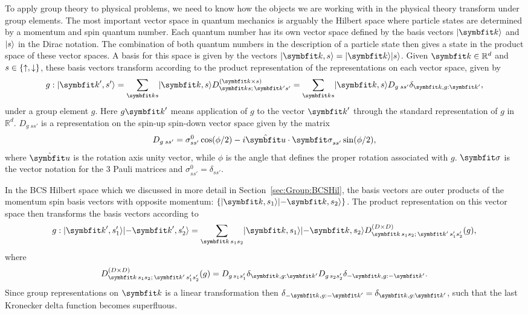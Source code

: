 To apply group theory to physical problems, we need to know how the objects we are working with in the physical theory transform under group elements.
The most important vector space in quantum mechanics is arguably the Hilbert space where particle states are determined by a momentum and spin
quantum number. Each quantum number has its own vector space defined by the basis vectors $\ket{\v{k}}$ and $\lvert s \rangle$ in the Dirac notation. The
combination of both quantum numbers in the description of a particle state then gives a state in the product space of these vector spaces.
A basis for this space is given by the vectors $\ket{\v{k},s} = \ket{\v{k}}\ket{s}$. Given $\v{k}\in\mathbb{R}^d$ and $s\in\{\uparrow,\downarrow\}$,
these basis vectors transform according to the product representation of the representations on each vector space, given by
\begin{equation}
    \label{eq:Group:App}
    g : \ket{\v{k}',s'} = \sum_{\v{k}s}\ket{\v{k},s}D^{(\v{k}\times s)}_{\v{k}s;\,\v{k}'s'} = \sum_{\v{k}s}\ket{\v{k},s}D_{g\;ss'}\delta_{\v{k},g:\v{k}'},
\end{equation}
under a group element $g$. Here $g\v{k}'$ means application of $g$ to the vector $\v{k}'$ through the standard representation of $g$ in $\mathbb{R}^d$.
$D_{g\;ss'}$ is a representation on the spin-up spin-down vector space given by the matrix
\begin{equation}
    \label{eq:Group:Prod:spinRepMatrix}
    D_{g\;ss'} = \sigma^0_{ss'}\cos(\phi/2) - i\hat{\v{u}}\cdot\v{\sigma}_{ss'}\sin(\phi/2),
\end{equation}
where $\hat{\v{u}}$ is the rotation axis unity vector, while $\phi$ is the angle that defines the proper rotation associated with $g$. $\v{\sigma}$ is
the vector notation for the $3$ Pauli matrices and $\sigma^0_{ss'}=\delta_{ss'}$.

In the BCS Hilbert space which we discussed in more detail in Section~\ref{sec:Group:BCSHil},
the basis vectors are outer products of the momentum spin basis vectors with opposite momentum: $\{\ket{\v{k},s_1}\ket{-\v{k},s_2}\}$. The product
representation on this vector space then transforms the basis vectors according to
\begin{equation}
    \label{eq:Group:Prod:BCSProdRep}
    g:\ket{\v{k}',s_1'}\ket{-\v{k}',s_2'} = \sum_{\v{k}\,s_1s_2}\ket{\v{k},s_1}\ket{-\v{k},s_2}D^{(D\times D)}_{\v{k}\,s_1s_2;\,\v{k}'\,s_1's_2'}(g),
\end{equation}
where
\begin{equation}
    \label{eq:Group:Prod:BCSProdMatrix}
    D^{(D\times D)}_{\v{k}\,s_1s_2;\,\v{k}'\,s_1's_2'}(g) = D_{g\,s_1s_1'}\delta_{\v{k},g:\v{k}'}D_{g\,s_2s_2'}\delta_{-\v{k},g:-\v{k}'}.
\end{equation}
Since group representations on $\v{k}$ is a linear transformation then $\delta_{-\v{k},g:-\v{k}'} = \delta_{\v{k},g:\v{k}'}$, such that the last
Kronecker delta function becomes superfluous.

